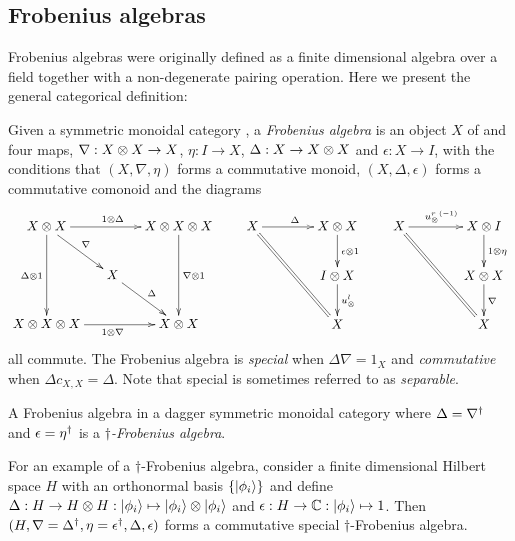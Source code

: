 \subsection{Frobenius algebras} %
\label{sub:frobenius_algebras}
Frobenius algebras were originally defined as a finite dimensional algebra over a field together with a
non-degenerate pairing operation. Here we present the general categorical definition:

\begin{definition}\label{def:frobeniusalgebra}
  Given a symmetric monoidal category \cD, a \emph{Frobenius algebra} is an object $X$ of \cD and
  four maps, $\nabla :X\otimes X \to X$, $\eta: I \to X$, $\Delta: X\to X\otimes X$ and $\epsilon:X\to I$, with
  the conditions that $(X,\nabla,\eta)$ forms a commutative monoid, $(X,\Delta, \epsilon)$ forms a
  commutative comonoid and the diagrams
  \[
    \xymatrix@C-10pt{
      X\*X \ar[rr]^{1\*\Delta} \ar[dd]_{\Delta \* 1} \ar[dr]^{\nabla}
        && X\*X\*X \ar[dd]^{\nabla\*1}\\
      & X\ar[dr]^{\Delta}\\
      X\*X\*X\ar[rr]_{1\*\nabla}  && X\*X
    }\qquad
    \xymatrix@C+15pt{
      X \ar[r]^{\Delta} \ar@{=}[ddr] & X\*X \ar[d]^{\epsilon\*1} \\
      & I\*X \ar[d]^{\usl}\\
      & X
    }\qquad
    \xymatrix@C+15pt{
      X \ar[r]^{\inv{\usr}} \ar@{=}[ddr] & X\*I \ar[d]^{1\*\eta}\\
      & X\*X \ar[d]^{\nabla} \\
      & X
    }
  \]
  all commute. The Frobenius algebra is \emph{special} when $\Delta \nabla = 1_{X}$ and
  \emph{commutative} when $\Delta c_{X,X} = \Delta$. Note that special is sometimes referred to as
  \emph{separable}.
\end{definition}
\begin{definition}\label{def:daggerfrob}
  A Frobenius algebra in a dagger symmetric monoidal category where $\Delta = {\nabla}^{\dagger}$ and
  $\epsilon={\eta}^{\dagger}$ is a $\dagger$\emph{-Frobenius algebra}.
\end{definition}
For an example of a $\dagger$-Frobenius algebra, consider a finite dimensional Hilbert space $H$
with an orthonormal basis $\{\left\vert{\phi_{i}}\right\rangle\}$ and define $\Delta:H\to H\otimes H: \left\vert{\phi_{i}}\right\rangle\mapsto
\left\vert{\phi_{i}}\right\rangle \otimes \left\vert{\phi_{i}}\right\rangle$ and $\epsilon : H\to \mathbb{C} : \left\vert{\phi_{i}}\right\rangle \mapsto 1$. Then $(H,
\nabla={\Delta}^{\dagger}, \eta={\epsilon}^{\dagger}, \Delta, \epsilon)$ forms a commutative special
$\dagger$-Frobenius algebra.


